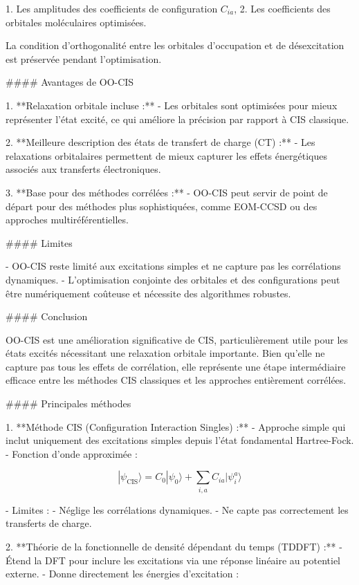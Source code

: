 \documentclass[12pt,a4paper]{report}
\begin{document}
\begin{markdown}
1. Les amplitudes des coefficients de configuration \(C_{ia}\),
2. Les coefficients des orbitales moléculaires optimisées.

La condition d’orthogonalité entre les orbitales d’occupation et de désexcitation est préservée pendant l’optimisation.

#### Avantages de OO-CIS

1. **Relaxation orbitale incluse :**
   - Les orbitales sont optimisées pour mieux représenter l'état excité, ce qui améliore la précision par rapport à CIS classique.

2. **Meilleure description des états de transfert de charge (CT) :**
   - Les relaxations orbitalaires permettent de mieux capturer les effets énergétiques associés aux transferts électroniques.

3. **Base pour des méthodes corrélées :**
   - OO-CIS peut servir de point de départ pour des méthodes plus sophistiquées, comme EOM-CCSD ou des approches multiréférentielles.

#### Limites

- OO-CIS reste limité aux excitations simples et ne capture pas les corrélations dynamiques.
- L'optimisation conjointe des orbitales et des configurations peut être numériquement coûteuse et nécessite des algorithmes robustes.

#### Conclusion

OO-CIS est une amélioration significative de CIS, particulièrement utile pour les états excités nécessitant une relaxation orbitale importante. Bien qu'elle ne capture pas tous les effets de corrélation, elle représente une étape intermédiaire efficace entre les méthodes CIS classiques et les approches entièrement corrélées. 


#### Principales méthodes

1. **Méthode CIS (Configuration Interaction Singles) :**
   - Approche simple qui inclut uniquement des excitations simples depuis l’état fondamental Hartree-Fock.
   - Fonction d’onde approximée :

\[
|\psi_{\text{CIS}}\rangle = C_0 |\psi_0\rangle + \sum_{i,a} C_{ia} |\psi_i^a\rangle
\]

   - Limites :
     - Néglige les corrélations dynamiques.
     - Ne capte pas correctement les transferts de charge.

2. **Théorie de la fonctionnelle de densité dépendant du temps (TDDFT) :**
   - Étend la DFT pour inclure les excitations via une réponse linéaire au potentiel externe.
   - Donne directement les énergies d'excitation :


\end{markdown}
\end{document}

